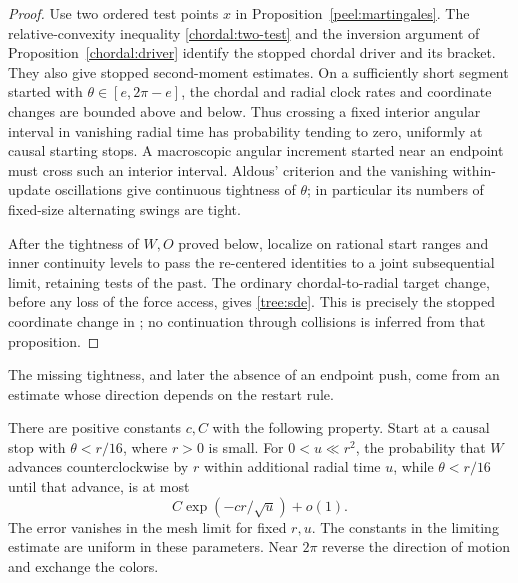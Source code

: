 \begin{proof}
Use two ordered test points $x$ in Proposition~\ref{peel:martingales}.
The relative-convexity inequality \eqref{chordal:two-test} and the inversion
argument of Proposition~\ref{chordal:driver} identify the stopped
chordal driver and its bracket.  They also give
stopped second-moment estimates.  On a sufficiently short segment
started with $\theta\in[e,2\pi-e]$, the chordal and radial clock rates
and coordinate changes are bounded above and below.  Thus crossing a
fixed interior angular interval in vanishing radial time has
probability tending to zero, uniformly at causal starting stops.
A macroscopic angular increment started near an endpoint must cross
such an interior interval.  Aldous' criterion and the vanishing
within-update oscillations give continuous tightness of $\theta$;
in particular its numbers of fixed-size alternating swings are tight.

After the tightness of $W,O$ proved below, localize on rational start
ranges and inner continuity levels to pass the re-centered identities
to a joint subsequential limit, retaining tests of the past.  The
ordinary chordal-to-radial target change, before any loss of the force
access, gives \eqref{tree:sde}.  This is precisely the stopped
coordinate change in \citet[Proposition~3.12]{Sheffield2009Exploration};
no continuation through collisions is inferred from that proposition.
\end{proof}

The missing tightness, and later the absence of an endpoint push, come
from an estimate whose direction depends on the restart rule.

\begin{lemma}\label{tree:bar}
There are positive constants $c,C$ with the following property.  Start
at a causal stop with $\theta<r/16$, where $r>0$ is small.  For
$0<u\ll r^2$, the probability that $W$ advances counterclockwise by
$r$ within additional radial time $u$, while $\theta<r/16$ until that
advance, is at most
\begin{equation}\label{tree:bar-bound}
 C\exp(-cr/\sqrt u)+o(1).
\end{equation}
The error vanishes in the mesh limit for fixed $r,u$.  The constants
in the limiting estimate are uniform in these parameters.  Near
$2\pi$ reverse the direction of motion and exchange the colors.
\end{lemma}

